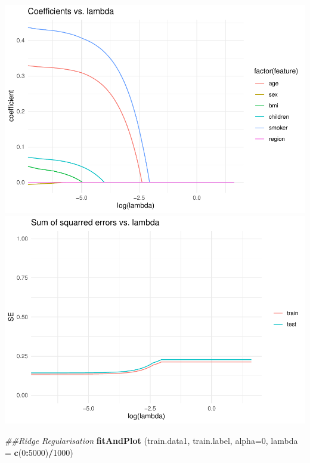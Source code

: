 \documentclass[
]{article}
\newenvironment{Shaded}{\begin{snugshade}}{\end{snugshade}}
\newcommand{\CommentTok}[1]{\textcolor[rgb]{0.56,0.35,0.01}{\textit{#1}}}
\newcommand{\DataTypeTok}[1]{\textcolor[rgb]{0.13,0.29,0.53}{#1}}
\newcommand{\DecValTok}[1]{\textcolor[rgb]{0.00,0.00,0.81}{#1}}
\newcommand{\KeywordTok}[1]{\textcolor[rgb]{0.13,0.29,0.53}{\textbf{#1}}}
\newcommand{\NormalTok}[1]{#1}
\newcommand{\OperatorTok}[1]{\textcolor[rgb]{0.81,0.36,0.00}{\textbf{#1}}}
\begin{document}
\begin{Shaded}
\end{Shaded}

\includegraphics{assessment-1_files/figure-latex/unnamed-chunk-18-1.pdf}
\includegraphics{assessment-1_files/figure-latex/unnamed-chunk-18-2.pdf}

\begin{Shaded}
\begin{Highlighting}[]
\CommentTok{##Ridge Regularisation }
\KeywordTok{fitAndPlot}\NormalTok{ (train.data1, train.label, }\DataTypeTok{alpha=}\DecValTok{0}\NormalTok{, }\DataTypeTok{lambda =} \KeywordTok{c}\NormalTok{(}\DecValTok{0}\OperatorTok{:}\DecValTok{5000}\NormalTok{)}\OperatorTok{/}\DecValTok{1000}\NormalTok{)}
\end{Highlighting}
\end{Shaded}
\end{document}
